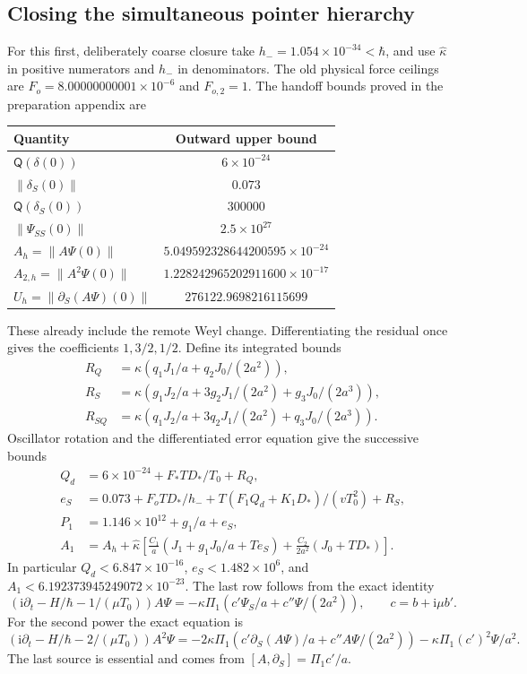 \documentclass[11pt]{article}
\theoremstyle{definition}\newtheorem{definition}[theorem]{Definition}
\theoremstyle{remark}\newtheorem{remark}[theorem]{Remark}
\begin{document}
\subsection{Closing the simultaneous pointer hierarchy}
\label{prefix:hierarchy}
For this first, deliberately coarse closure take
$h_-=1.054\times10^{-34}<\hbar$, and use $\widehat\kappa$ in positive
numerators and $h_-$ in denominators.  The old physical force ceilings
are $F_o=8.00000000001\times10^{-6}$ and $F_{o,2}=1$.
The handoff bounds proved in the preparation appendix are
\begin{center}
\begin{tabular}{lc}
\toprule
Quantity & Outward upper bound\\
\midrule
$\mathsf Q(\delta(0))$ & $6\times10^{-24}$\\
$\|\delta_S(0)\|$ & $0.073$\\
$\mathsf Q(\delta_S(0))$ & $300000$\\
$\|\Psi_{SS}(0)\|$ & $2.5\times10^{27}$\\
$A_h=\|A\Psi(0)\|$ & $5.049592328644200595\times10^{-24}$\\
$A_{2,h}=\|A^2\Psi(0)\|$ & $1.228242965202911600\times10^{-17}$\\
$U_h=\|\partial_S(A\Psi)(0)\|$ & $276122.9698216115699$\\
\bottomrule
\end{tabular}
\end{center}
These already include the remote Weyl change.
Differentiating the residual once gives the coefficients $1,3/2,1/2$.
Define its integrated bounds
\begin{align*}
 R_Q&=\widehat\kappa(q_1J_1/a+q_2J_0/(2a^2)),\\
 R_S&=\widehat\kappa(g_1J_2/a+3g_2J_1/(2a^2)+g_3J_0/(2a^3)),\\
 R_{SQ}&=\widehat\kappa(q_1J_2/a+3q_2J_1/(2a^2)+q_3J_0/(2a^3)).
\end{align*}
Oscillator rotation and the differentiated error equation give the
successive bounds
\begin{align*}
 Q_d&=6\times10^{-24}+F_*TD_*/T_0+R_Q,\\
 e_S&=0.073+F_oTD_*/h_-+T(F_1Q_d+K_1D_*)/(vT_0^2)+R_S,\\
 P_1&=1.146\times10^{12}+g_1/a+e_S,\\
 A_1&=A_h+\widehat\kappa\left[
 \frac{C_1}{a}(J_1+g_1J_0/a+Te_S)
                +\frac{C_2}{2a^2}(J_0+TD_*)\right].
\end{align*}
In particular $Q_d<6.847\times10^{-16}$, $e_S<1.482\times10^6$,
and $A_1<6.192373945249072\times10^{-23}$.
The last row follows from the exact identity
\begin{equation}
 (\mathrm i\partial_t-H/\hbar-1/(\mu T_0))A\Psi
 =-\kappa\Pi_1(c'\Psi_S/a+c''\Psi/(2a^2)),
 \qquad c=b+\mathrm i\mu b'.
 \label{prefix:Aeq}
\end{equation}
For the second power the exact equation is
\[
 (\mathrm i\partial_t-H/\hbar-2/(\mu T_0))A^2\Psi
 =-2\kappa\Pi_1(c'\partial_S(A\Psi)/a+c''A\Psi/(2a^2))
                     -\kappa\Pi_1(c')^2\Psi/a^2.
\]
The last source is essential and comes from $[A,\partial_S]=\Pi_1c'/a$.
\end{document}
